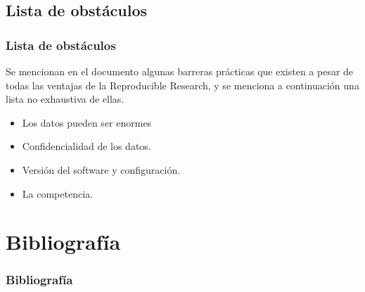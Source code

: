 \documentclass[11pt]{beamer}					%
\begin{document}
		\subsection{Lista de obstáculos}	
		 \begin{frame}[fragile]	
		 \frametitle{Lista de obstáculos}
		Se mencionan en el documento algunas barreras prácticas que existen a pesar de todas las ventajas de la Reproducible Research, y se menciona a continuación una lista no exhaustiva de ellas.
		
		\begin{itemize}
			    \item Los datos pueden ser enormes
				\item Confidencialidad de los datos.
				\item Versión del software y configuración.
				\item La competencia.

				
		\end{itemize}
		
		\end{frame}
		

							
\section{Bibliografía}	
	\begin{frame}[fragile]
		\frametitle{Bibliografía} 		
       	\nocite{*}				%
	\end{frame}		
				
\end{document}
